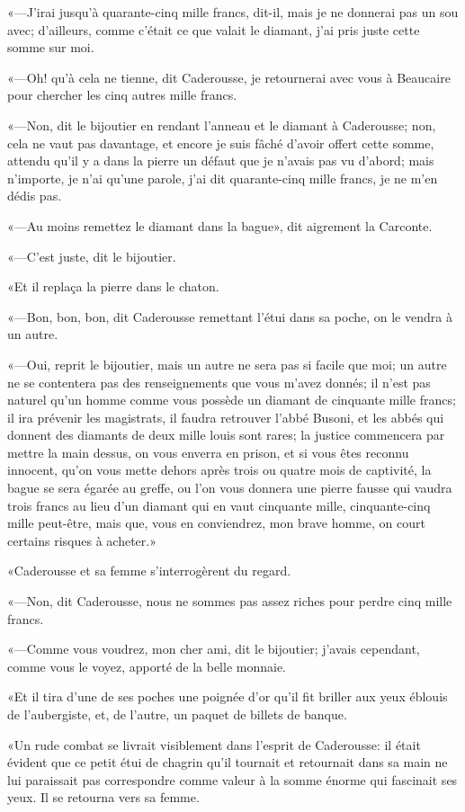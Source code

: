 «—J'irai jusqu'à quarante-cinq mille francs, dit-il, mais je ne donnerai pas un sou avec; d'ailleurs, comme c'était ce que valait le diamant, j'ai pris juste cette somme sur moi. 

«—Oh! qu'à cela ne tienne, dit Caderousse, je retournerai avec vous à Beaucaire pour chercher les cinq autres mille francs. 

«—Non, dit le bijoutier en rendant l'anneau et le diamant à Caderousse; non, cela ne vaut pas davantage, et encore je suis fâché d'avoir offert cette somme, attendu qu'il y a dans la pierre un défaut que je n'avais pas vu d'abord; mais n'importe, je n'ai qu'une parole, j'ai dit quarante-cinq mille francs, je ne m'en dédis pas. 

«—Au moins remettez le diamant dans la bague», dit aigrement la Carconte. 

«—C'est juste, dit le bijoutier. 

«Et il replaça la pierre dans le chaton.  

«—Bon, bon, bon, dit Caderousse remettant l'étui dans sa poche, on le vendra à un autre. 

«—Oui, reprit le bijoutier, mais un autre ne sera pas si facile que moi; un autre ne se contentera pas des renseignements que vous m'avez donnés; il n'est pas naturel qu'un homme comme vous possède un diamant de cinquante mille francs; il ira prévenir les magistrats, il faudra retrouver l'abbé Busoni, et les abbés qui donnent des diamants de deux mille louis sont rares; la justice commencera par mettre la main dessus, on vous enverra en prison, et si vous êtes reconnu innocent, qu'on vous mette dehors après trois ou quatre mois de captivité, la bague se sera égarée au greffe, ou l'on vous donnera une pierre fausse qui vaudra trois francs au lieu d'un diamant qui en vaut cinquante mille, cinquante-cinq mille peut-être, mais que, vous en conviendrez, mon brave homme, on court certains risques à acheter.» 

«Caderousse et sa femme s'interrogèrent du regard. 

«—Non, dit Caderousse, nous ne sommes pas assez riches pour perdre cinq mille francs. 

«—Comme vous voudrez, mon cher ami, dit le bijoutier; j'avais cependant, comme vous le voyez, apporté de la belle monnaie. 

«Et il tira d'une de ses poches une poignée d'or qu'il fit briller aux yeux éblouis de l'aubergiste, et, de l'autre, un paquet de billets de banque.  

«Un rude combat se livrait visiblement dans l'esprit de Caderousse: il était évident que ce petit étui de chagrin qu'il tournait et retournait dans sa main ne lui paraissait pas correspondre comme valeur à la somme énorme qui fascinait ses yeux. Il se retourna vers sa femme. 


